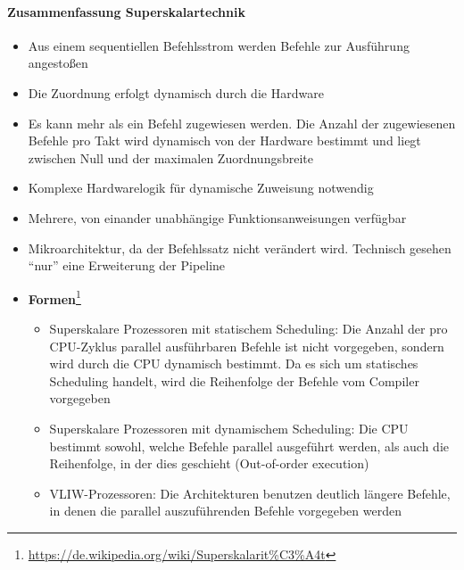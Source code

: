 \paragraph{Zusammenfassung Superskalartechnik}
\begin{itemize}
	\item Aus einem sequentiellen Befehlsstrom werden Befehle zur Ausführung angestoßen
	\item Die Zuordnung erfolgt dynamisch durch die Hardware
	\item Es kann mehr als ein Befehl zugewiesen werden. Die Anzahl der zugewiesenen Befehle pro Takt wird dynamisch von der Hardware bestimmt und liegt zwischen Null und der maximalen Zuordnungsbreite
	\item Komplexe Hardwarelogik für dynamische Zuweisung notwendig
	\item Mehrere, von einander unabhängige Funktionsanweisungen verfügbar
	\item Mikroarchitektur, da der Befehlssatz nicht verändert wird. Technisch gesehen "`nur"' eine Erweiterung der Pipeline
	\item \textbf{Formen}\footnote{\url{https://de.wikipedia.org/wiki/Superskalarit\%C3\%A4t}}
	\begin{itemize}
		\item Superskalare Prozessoren mit statischem Scheduling: Die Anzahl der pro CPU-Zyklus parallel ausführbaren Befehle ist nicht vorgegeben, sondern wird durch die CPU dynamisch bestimmt. Da es sich um statisches Scheduling handelt, wird die Reihenfolge der Befehle vom Compiler vorgegeben
		\item Superskalare Prozessoren mit dynamischem Scheduling: Die CPU bestimmt sowohl, welche Befehle parallel ausgeführt werden, als auch die Reihenfolge, in der dies geschieht (Out-of-order execution)
		\item VLIW-Prozessoren: Die Architekturen benutzen deutlich längere Befehle, in denen die parallel auszuführenden Befehle vorgegeben werden
	\end{itemize}
\end{itemize}

